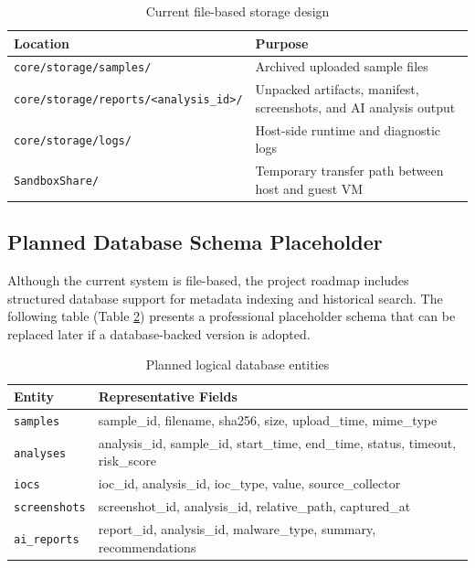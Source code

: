 \documentclass[a4paper,12pt,oneside]{report}
\begin{document}
\begin{table}[H]
\centering
\caption{Current file-based storage design}
\label{tab:storage_design}
\begin{tabularx}{\textwidth}{>{\raggedright\arraybackslash}p{7.5cm}X}
\toprule
\textbf{Location} & \textbf{Purpose} \\
\midrule
\texttt{core/storage/samples/} & Archived uploaded sample files \\
\texttt{core/storage/reports/}\newline\texttt{<analysis\_id>/} & Unpacked artifacts, manifest, screenshots, and AI analysis output \\
\texttt{core/storage/logs/} & Host-side runtime and diagnostic logs \\
\texttt{SandboxShare/} & Temporary transfer path between host and guest VM \\
\bottomrule
\end{tabularx}
\end{table}

\subsection{Planned Database Schema Placeholder}
Although the current system is file-based, the project roadmap includes structured database support for metadata indexing and historical search. The following table (Table \ref{tab:db_schema}) presents a professional placeholder schema that can be replaced later if a database-backed version is adopted.

\begin{table}[H]
\centering
\caption{Planned logical database entities}
\label{tab:db_schema}
\begin{tabularx}{\textwidth}{>{\raggedright\arraybackslash}p{3.2cm}X}
\toprule
\textbf{Entity} & \textbf{Representative Fields} \\
\midrule
\texttt{samples} & sample\_id, filename, sha256, size, upload\_time, mime\_type \\
\texttt{analyses} & analysis\_id, sample\_id, start\_time, end\_time, status, timeout, risk\_score \\
\texttt{iocs} & ioc\_id, analysis\_id, ioc\_type, value, source\_collector \\
\texttt{screenshots} & screenshot\_id, analysis\_id, relative\_path, captured\_at \\
\texttt{ai\_reports} & report\_id, analysis\_id, malware\_type, summary, recommendations \\
\bottomrule
\end{tabularx}
\end{table}
\end{document}
